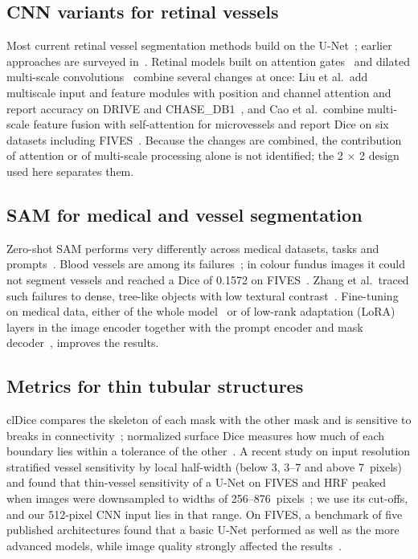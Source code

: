\subsection*{CNN variants for retinal vessels}
Most current retinal vessel segmentation methods build on the U-Net~\cite{ronneberger2015unet}; earlier approaches are
surveyed in~\cite{fraz2012survey}. Retinal models built on attention gates~\cite{oktay2018attention} and dilated
multi-scale convolutions~\cite{yu2016dilated} combine several changes at once: Liu et al.\ add
multiscale input and feature modules with position and channel attention and report accuracy on DRIVE and
CHASE\_DB1~\cite{liu2022msunet}, and Cao et al.\ combine multi-scale feature fusion with self-attention for microvessels and
report Dice on six datasets including FIVES~\cite{cao2023mfaunet}. Because the changes are combined, the contribution of
attention or of multi-scale processing alone is not identified; the 2 $\times$ 2 design used here separates them.

\subsection*{SAM for medical and vessel segmentation}
Zero-shot SAM performs very differently across medical datasets, tasks and prompts~\cite{mazurowski2023sam,huang2024sam}. Blood vessels are among its failures~\cite{shi2023samzeroshot}; in colour
fundus images it could not segment vessels and reached a Dice of 0.1572 on FIVES~\cite{qiu2023learnable}. Zhang et al.\
traced such failures to dense, tree-like objects with low textural contrast~\cite{zhang2024samlimits}. Fine-tuning on
medical data, either of the whole model~\cite{ma2024medsam} or of low-rank adaptation (LoRA)~\cite{hu2022lora} layers in the image encoder together with the prompt
encoder and mask decoder~\cite{zhang2023samed}, improves the results.

\subsection*{Metrics for thin tubular structures}
clDice compares the skeleton of each mask with the other mask and is sensitive to breaks in
connectivity~\cite{shit2021cldice}; normalized surface Dice measures how much of each boundary lies within a tolerance of
the other~\cite{nikolov2021nsd}. A recent study on input resolution stratified vessel sensitivity by local half-width
(below 3, 3--7 and above 7~pixels) and found that thin-vessel sensitivity of a U-Net on FIVES and HRF peaked when images
were downsampled to widths of 256--876~pixels~\cite{amarnath2026resolution}; we use its cut-offs, and our 512-pixel CNN
input lies in that range. On FIVES, a benchmark of five published architectures found that a basic U-Net performed as well
as the more advanced models, while image quality strongly affected the results~\cite{fadugba2024benchmark}.
